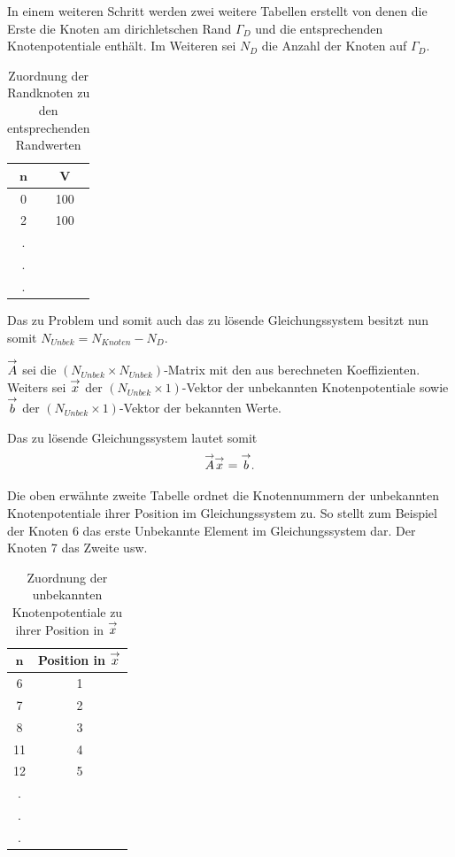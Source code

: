 In einem weiteren Schritt werden zwei weitere Tabellen erstellt von denen die Erste die Knoten am dirichletschen Rand $\Gamma_D$ und die entsprechenden Knotenpotentiale enthält. Im Weiteren sei $N_D$ die Anzahl der Knoten auf $\Gamma_D$.\newline
\begin{table}[htbp]
	\centering
\begin{tabular}{c|c}
	$\mathbf{n}$	&$\mathbf{V}$ \\
	\hline\hline
	0 & 100\\
	2 & 100\\
	.&\\
	.&\\
	.&\\
\end{tabular}
\caption{Zuordnung der Randknoten zu den entsprechenden Randwerten}
\end{table}



Das zu Problem und somit auch das zu lösende Gleichungssystem besitzt nun somit $N_{Unbek} = N_{Knoten}-N_D$.\newline

$\overset{\rightarrow}{A}$ sei die $\left(N_{Unbek}\times N_{Unbek}\right)$-Matrix mit den aus  berechneten Koeffizienten.
Weiters sei $\overset{\rightarrow}{x}$ der $\left(N_{Unbek}\times 1\right)$-Vektor der unbekannten Knotenpotentiale sowie $\overset{\rightarrow}{b}$ der $\left(N_{Unbek}\times 1\right)$-Vektor der bekannten Werte.\newline

Das zu lösende Gleichungssystem lautet somit
\begin{align}
	\label{eq:eq_sys}
	\overset{\rightarrow}{A}\overset{\rightarrow}{x}=\overset{\rightarrow}{b}.
\end{align}

Die oben erwähnte zweite Tabelle ordnet die Knotennummern der unbekannten Knotenpotentiale ihrer Position im Gleichungssystem zu. So stellt zum Beispiel der Knoten 6 das erste Unbekannte Element im Gleichungssystem dar. Der Knoten 7 das Zweite usw. 

\begin{table}[htbp]
	\centering
	\begin{tabular}{c|c}
		$\mathbf{n}$	&Position in $\overset{\rightarrow}{x}$ \\
		\hline\hline
		6&1\\
		7&2\\
		8&3\\
		11&4\\
		12&5\\
		.&\\
		.&\\
		.&\\
	\end{tabular}
	\caption{Zuordnung der unbekannten Knotenpotentiale zu ihrer Position in $\overset{\rightarrow}{x}$}
\end{table}

